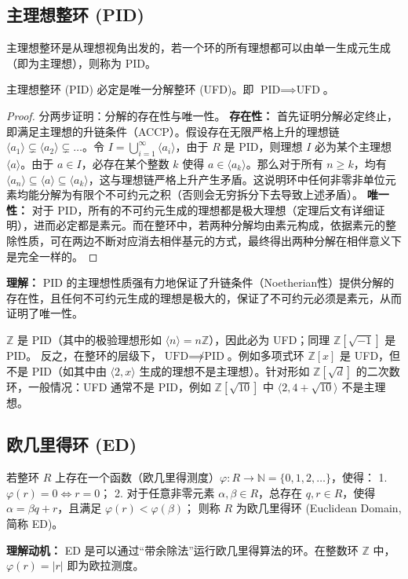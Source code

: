 \documentclass[11pt]{article}
\begin{document}
\subsection{主理想整环 (PID)}
主理想整环是从理想视角出发的，若一个环的所有理想都可以由单一生成元生成（即为主理想），则称为 PID。
\begin{cntheorem}
主理想整环 (PID) 必定是唯一分解整环 (UFD)。即 $\text{PID} \implies \text{UFD}$。
\end{cntheorem}
\begin{proof}
分两步证明：分解的存在性与唯一性。
\textbf{存在性：} 首先证明分解必定终止，即满足主理想的升链条件（ACCP）。假设存在无限严格上升的理想链 $\langle a_1 \rangle \subsetneq \langle a_2 \rangle \subsetneq \dots$。令 $I = \bigcup_{i=1}^{\infty} \langle a_i \rangle$，由于 $R$ 是 PID，则理想 $I$ 必为某个主理想 $\langle a \rangle$。由于 $a \in I$，必存在某个整数 $k$ 使得 $a \in \langle a_k \rangle$。那么对于所有 $n \ge k$，均有 $\langle a_n \rangle \subseteq \langle a \rangle \subseteq \langle a_k \rangle$，这与理想链严格上升产生矛盾。这说明环中任何非零非单位元素均能分解为有限个不可约元之积（否则会无穷拆分下去导致上述矛盾）。
\textbf{唯一性：} 对于 PID，所有的不可约元生成的理想都是极大理想（定理后文有详细证明），进而必定都是素元。而在整环中，若两种分解均由素元构成，依据素元的整除性质，可在两边不断对应消去相伴基元的方式，最终得出两种分解在相伴意义下是完全一样的。
\end{proof}
\noindent \textbf{理解：} PID 的主理想性质强有力地保证了升链条件（Noetherian性）提供分解的存在性，且任何不可约元生成的理想是极大的，保证了不可约元必须是素元，从而证明了唯一性。
\begin{cnexample}
$\mathbb{Z}$ 是 PID（其中的极验理想形如 $\langle n \rangle = n\mathbb{Z}$），因此必为 UFD；同理 $\mathbb{Z}[\sqrt{-1}]$ 是 PID。
反之，在整环的层级下，$\text{UFD} \not\implies \text{PID}$。例如多项式环 $\mathbb{Z}[x]$ 是 UFD，但不是 PID（如其中由 $\langle 2, x \rangle$ 生成的理想不是主理想）。针对形如 $\mathbb{Z}[\sqrt{d}]$ 的二次数环，一般情况：UFD 通常不是 PID，例如 $\mathbb{Z}[\sqrt{10}]$ 中 $\langle 2, 4+\sqrt{10} \rangle$ 不是主理想。
\end{cnexample}

\subsection{欧几里得环 (ED)}
\begin{cndefinition}[欧几里得环]
若整环 $R$ 上存在一个函数（欧几里得测度）$\varphi: R \to \mathbb{N} = \{0, 1, 2, \dots\}$，使得：
1. $\varphi(r) = 0 \iff r = 0$；
2. 对于任意非零元素 $\alpha, \beta \in R$，总存在 $q, r \in R$，使得 $\alpha = \beta q + r$，且满足 $\varphi(r) < \varphi(\beta)$；
则称 $R$ 为欧几里得环 (Euclidean Domain, 简称 ED)。
\end{cndefinition}
\noindent \textbf{理解动机：} ED 是可以通过“带余除法”运行欧几里得算法的环。在整数环 $\mathbb{Z}$ 中，$\varphi(r) = |r|$ 即为欧拉测度。
\end{document}
